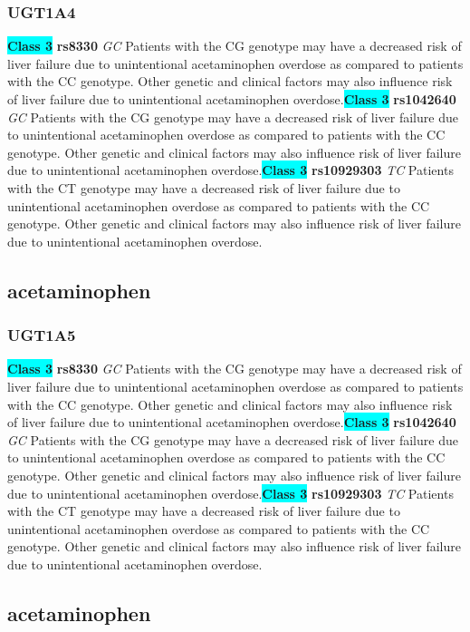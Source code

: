 \documentclass{book}
\begin{document}
\subsubsection{ UGT1A4 }

\begin{center}
\textbf{\colorbox{cyan} {Class 3}} \textbf{ rs8330 } \textit{ GC }
Patients with the CG genotype may have a decreased risk of liver failure due to unintentional acetaminophen overdose as compared to patients with the CC genotype. Other genetic and clinical factors may also influence risk of liver failure due to unintentional acetaminophen overdose.\textbf{\colorbox{cyan} {Class 3}} \textbf{ rs1042640 } \textit{ GC }
Patients with the CG genotype may have a decreased risk of liver failure due to unintentional acetaminophen overdose as compared to patients with the CC genotype. Other genetic and clinical factors may also influence risk of liver failure due to unintentional acetaminophen overdose.\textbf{\colorbox{cyan} {Class 3}} \textbf{ rs10929303 } \textit{ TC }
Patients with the CT genotype may have a decreased risk of liver failure due to unintentional acetaminophen overdose as compared to patients with the CC genotype. Other genetic and clinical factors may also influence risk of liver failure due to unintentional acetaminophen overdose.


\end{center}\subsection{ acetaminophen }


\subsubsection{ UGT1A5 }

\begin{center}
\textbf{\colorbox{cyan} {Class 3}} \textbf{ rs8330 } \textit{ GC }
Patients with the CG genotype may have a decreased risk of liver failure due to unintentional acetaminophen overdose as compared to patients with the CC genotype. Other genetic and clinical factors may also influence risk of liver failure due to unintentional acetaminophen overdose.\textbf{\colorbox{cyan} {Class 3}} \textbf{ rs1042640 } \textit{ GC }
Patients with the CG genotype may have a decreased risk of liver failure due to unintentional acetaminophen overdose as compared to patients with the CC genotype. Other genetic and clinical factors may also influence risk of liver failure due to unintentional acetaminophen overdose.\textbf{\colorbox{cyan} {Class 3}} \textbf{ rs10929303 } \textit{ TC }
Patients with the CT genotype may have a decreased risk of liver failure due to unintentional acetaminophen overdose as compared to patients with the CC genotype. Other genetic and clinical factors may also influence risk of liver failure due to unintentional acetaminophen overdose.


\end{center}\subsection{ acetaminophen }
\end{document}
